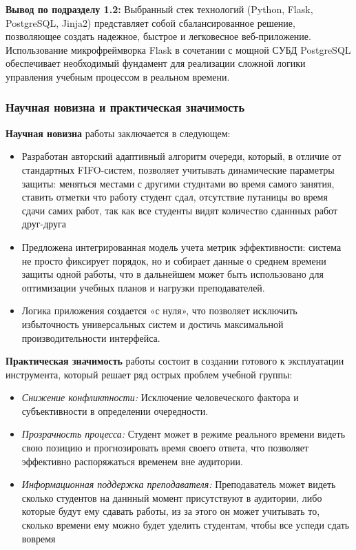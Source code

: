 \textbf{Вывод по подразделу 1.2:} Выбранный стек технологий (Python, Flask, PostgreSQL, Jinja2) представляет собой 
сбалансированное решение, позволяющее создать надежное, быстрое и легковесное веб-приложение. Использование микрофреймворка
 Flask в сочетании с мощной СУБД PostgreSQL обеспечивает необходимый фундамент для реализации сложной логики управления учебным 
 процессом в реальном времени.

 \subsubsection{Научная новизна и практическая значимость}

\textbf{Научная новизна} работы заключается в следующем:

\begin{itemize}
	\item Разработан авторский адаптивный алгоритм очереди, который, в отличие от стандартных FIFO-систем, 
	позволяет учитывать динамические параметры защиты: меняться местами с другими студнтами во время самого занятия,
	ставить отметки что работу студент сдал, отсутствие путаницы во время сдачи самих работ, так как все студенты
	видят количество сданнных работ друг-друга
	\item Предложена интегрированная модель учета метрик эффективности: система не просто фиксирует порядок, но и
	 собирает данные о среднем времени защиты одной работы, что в дальнейшем может быть использовано для 
	 оптимизации учебных планов и нагрузки преподавателей.
	\item Логика приложения создается «с нуля», что позволяет исключить избыточность универсальных 
	систем и достичь максимальной производительности интерфейса.
\end{itemize}

\textbf{Практическая значимость} работы состоит в создании готового к эксплуатации инструмента, 
который решает ряд острых проблем учебной группы:

\begin{itemize}
	\item \textit{Снижение конфликтности:} Исключение человеческого фактора и субъективности в определении 
	очередности.
	\item \textit{Прозрачность процесса:} Студент может в режиме реального времени видеть свою 
	позицию и прогнозировать время своего ответа, что позволяет эффективно распоряжаться временем вне аудитории.
	\item \textit{Информационная поддержка преподавателя:} Преподаватель может видеть сколько студентов на даннный
	момент присутствуют в аудитории, либо которые будут ему сдавать работы, из за этого он может учитывать то,
	сколько времени ему можно будет уделить студентам, чтобы все успеди сдать вовремя
\end{itemize}

